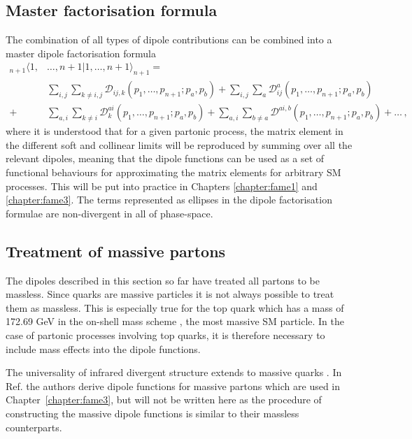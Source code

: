 \documentclass[main.tex]{subfiles}
\begin{document}
    \subsection{Master factorisation formula}
        The combination of all types of dipole contributions
        can be combined into a master dipole factorisation formula
        \begin{equation}\label{eqn:dipole_factorisation_master}
            \begin{split}
            {}_{n+1} \langle 1, &\ldots, n+1 | 1, \ldots, n+1 \rangle_{n+1} = \\
            &\sum_{i,j}\sum_{k \neq i, j} \mathcal{D}_{ij,k}(p_{1},\ldots,p_{n+1};p_{a},p_{b}) + \sum_{i,j}\sum_{a} \mathcal{D}_{ij}^{a}(p_{1},\ldots,p_{n+1};p_{a},p_{b}) \\
            + &\sum_{a,i}\sum_{k \neq i} \mathcal{D}_{k}^{ai}(p_{1},\ldots,p_{n+1};p_{a},p_{b}) + \sum_{a,i}\sum_{b \neq a} \mathcal{D}^{ai,b}(p_{1},\ldots,p_{n+1};p_{a},p_{b}) + \ldots \, ,
            \end{split}
        \end{equation}
        where it is understood that for a given partonic process,
        the matrix element in the different soft and collinear limits will be
        reproduced by summing over all the relevant dipoles, meaning that
        the dipole functions can be used as a set of functional behaviours for
        approximating the matrix elements for arbitrary SM processes.
        This will be put into practice in Chapters \ref{chapter:fame1}
        and \ref{chapter:fame3}. The terms represented as ellipses in
        the dipole factorisation formulae are non-divergent
        in all of phase-space.

    \subsection{Treatment of massive partons}
        The dipoles described in this section so far have
        treated all partons to be massless. Since quarks are massive
        particles it is not always possible to treat them
        as massless. This is especially true for the top
        quark which has a mass of 172.69 GeV in the on-shell mass
        scheme \cite{Workman:2022ynf},
        the most massive SM particle. In the case of partonic
        processes involving top quarks, it is therefore
        necessary to include mass effects into the dipole
        functions.

        The universality of infrared divergent structure
        extends to massive quarks \cite{Catani:2000ef}.
        In Ref. \cite{Catani:2002hc} the authors derive dipole
        functions for massive partons which
        are used in Chapter~\ref{chapter:fame3}, but will
        not be written here as the procedure of constructing
        the massive dipole functions is similar to their massless counterparts.
\end{document}
